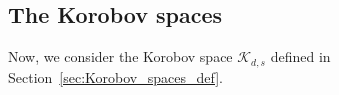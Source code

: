 \documentclass[twoside,11pt]{book}
\numberwithin{theorem}{chapter}
\numberwithin{definition}{chapter}
\numberwithin{proposition}{chapter}
\numberwithin{corollary}{chapter}
\numberwithin{example}{chapter}
\numberwithin{lemma}{chapter}
\numberwithin{assumption}{chapter}
\numberwithin{equation}{chapter}
\numberwithin{figure}{chapter}
\begin{document}
\subsection{The Korobov spaces}\label{sec:Korobov_num_simulations}
Now, we consider the Korobov space $\mathcal{K}_{d,s}$ defined in Section~\ref{sec:Korobov_spaces_def}.
\end{document}
